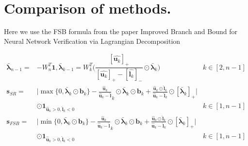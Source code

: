 \section{Comparison of methods.}

\label{sec4p5}

Here we use the FSB formula from the paper {Improved Branch and Bound for Neural Network
Verification via Lagrangian Decomposition}

\begin{align*}
	\bm{\bar{\lambda}}_{n-1} =& -W^T_n\bm{1},  	\bm{\bar{\lambda}}_{k-1} = W^T_k\big(\dfrac{[\hat{\bm{u}_k}]_+}{[\hat{\bm{u}_k}]_+-[\hat{\bm{l}_k}]_-}\odot\bm{\bar{\lambda}}_{k}\big) &k\in [2,n-1]\\
	\bm{s}_{SR} =& \lvert\max\{0,\bm{\bar{\lambda}}_{k}\odot\bm{b}_{k}\}-\frac{\hat{\bm{u}}_k}{\hat{\bm{u}}_k-\hat{\bm{l}}}_k\odot\bm{\bar{\lambda}}_{k}\odot\bm{{b}}_{k}+\frac{\hat{\bm{u}}_k\odot\hat{\bm{l}}_k}{\hat{\bm{u}}_k-\hat{\bm{l}}_k}\odot[\bm{\bar{\lambda}}_{k}]_+\rvert &\\
	&\odot\bm{1}_{\hat{\bm{u}}_k>0,\hat{\bm{l}}_k<0}&k\in [1,n-1]\\
	\bm{s}_{FSB} =& \lvert\min\{0,\bm{\bar{\lambda}}_{k}\odot\bm{b}_{k}\}-\frac{\hat{\bm{u}}_k}{\hat{\bm{u}}_k-\hat{\bm{l}}}_k\odot\bm{\bar{\lambda}}_{k}\odot\bm{{b}}_{k}+\frac{\hat{\bm{u}}_k\odot\hat{\bm{l}}_k}{\hat{\bm{u}}_k-\hat{\bm{l}}_k}\odot[\bm{\bar{\lambda}}_{k}]_+\rvert &\\
	&\odot\bm{1}_{\hat{\bm{u}}_k>0,\hat{\bm{l}}_k<0}&k\in [1,n-1]\\
\end{align*}



